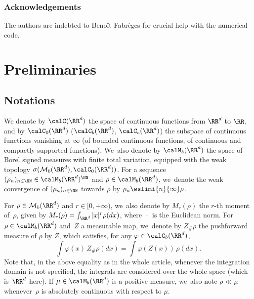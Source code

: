 \subsubsection*{Acknowledgements} The authors are indebted to Benoît Fabrèges for crucial help with the numerical code.

\section{Preliminaries}\label{section:preliminaries}

\subsection{Notations}

We denote by $\calC(\RR^d)$ the space of continuous functions from $\RR^d$ to $\RR$, and by $\calC_0(\RR^d)$ (\resp $\calC_b(\RR^d)$, $\calC_c(\RR^d)$) the subspace of continuous functions vanishing at $\infty$ (\resp of bounded continuous functions, of continuous and compactly supported functions). We~also denote by $\calM_b(\RR^d)$ the space of Borel signed measures with finite total variation, equipped with the weak topology $\sigma(\mathcal{M}_b(\RR^d),\calC_0(\RR^d))$. For a sequence $(\rho_n)_{n \in \NN} \in \calM_b(\RR^d)^\NN$ and $\rho \in \calM_b(\RR^d)$, we~denote the weak convergence of $(\rho_n)_{n \in \NN}$ towards $\rho$ by $\rho_n \wslimi{n}{\infty} \rho$.

For $\rho\in \mathcal{M}_{b}(\RR^d)$ and $r \in [0,+\infty)$, we~also denote by $M_r(\rho)$ the $r$-th moment of~$\rho$, given by $M_r(\rho) = \int_{\RR^d} |x|^r \rho(dx)$, where $|\cdot|$ is the Euclidean norm. For $\rho \in \calM_b(\RR^d)$ and~$Z$ a measurable map, we~denote by $Z_\#\rho$ the pushforward measure of $\rho$ by $Z$, which satisfies, for any $\varphi \in \calC_b(\RR^d)$,\vspace*{-3pt}
\[
\int \varphi(x)\, Z_\#\rho(dx) = \int \varphi(Z(x))\,\rho(dx).
\]
Note that, in the above equality as in the whole article, whenever the integration domain is not specified, the integrals are considered over the whole space (which is~$\RR^d$ here). If $\mu \in \calM_b(\RR^d)$ is a positive measure, we~also note $\rho \ll \mu$ whenever~$\rho$ is absolutely continuous with respect to $\mu$.

